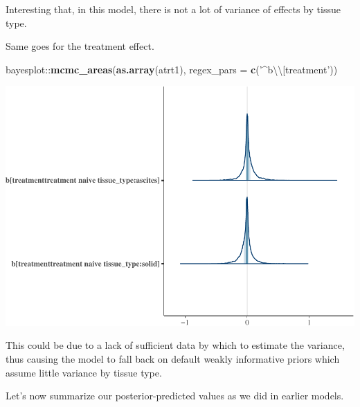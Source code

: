 \documentclass[]{article}
\newenvironment{Shaded}{\begin{snugshade}}{\end{snugshade}}
\newcommand{\KeywordTok}[1]{\textcolor[rgb]{0.13,0.29,0.53}{\textbf{{#1}}}}
\newcommand{\DataTypeTok}[1]{\textcolor[rgb]{0.13,0.29,0.53}{{#1}}}
\newcommand{\DecValTok}[1]{\textcolor[rgb]{0.00,0.00,0.81}{{#1}}}
\newcommand{\FloatTok}[1]{\textcolor[rgb]{0.00,0.00,0.81}{{#1}}}
\newcommand{\CharTok}[1]{\textcolor[rgb]{0.31,0.60,0.02}{{#1}}}
\newcommand{\StringTok}[1]{\textcolor[rgb]{0.31,0.60,0.02}{{#1}}}
\newcommand{\NormalTok}[1]{{#1}}
\begin{document}
Interesting that, in this model, there is not a lot of variance of
effects by tissue type.

Same goes for the treatment effect.

\begin{Shaded}
\begin{Highlighting}[]
\NormalTok{bayesplot::}\KeywordTok{mcmc_areas}\NormalTok{(}\KeywordTok{as.array}\NormalTok{(atrt1), }\DataTypeTok{regex_pars =} \KeywordTok{c}\NormalTok{(}\StringTok{'^b}\CharTok{\textbackslash{}\textbackslash{}}\StringTok{[treatment'}\NormalTok{))}
\end{Highlighting}
\end{Shaded}

\includegraphics{Hierarchical_model_mutations_and_peptides_files/figure-latex/allsamp-atrt1-coefplot-treatment-by-tissue-type-1.pdf}

This could be due to a lack of sufficient data by which to estimate the
variance, thus causing the model to fall back on default weakly
informative priors which assume little variance by tissue type.

Let's now summarize our posterior-predicted values as we did in earlier
models.

\begin{Shaded}
\end{Shaded}
\end{document}
